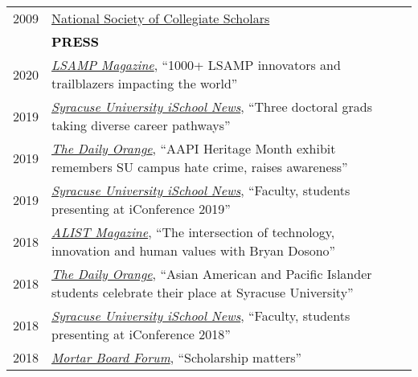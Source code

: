 \documentclass[11pt]{article}
\begin{document}
{{\begin{longtable}{Rp{0.75in}p{5.0in}}
\footnotesize{2009} & \href{https://nscs.org/}{National Society of Collegiate Scholars}\\

& \textcolor{black}{\uppercase{\textbf{Press}}}\\

\footnotesize{2020} & \href{https://lsmrce.org/documents/community/LSAMP-Trailblazers-Magazine-2020.pdf}{\textit{LSAMP Magazine}}, ``1000+ LSAMP innovators and trailblazers impacting the world''\\

\footnotesize{2019} & \href{https://ischool.syr.edu/three-doctoral-grads-taking-diverse-career-pathways-2019/}{\textit{Syracuse University iSchool News}}, ``Three doctoral grads taking diverse career pathways''\\

\footnotesize{2019} & \href{http://dailyorange.com/2019/04/aapi-heritage-month-exhibit-remembers-su-campus-hate-crime-raises-awareness/}{\textit{The Daily Orange}}, ``AAPI Heritage Month exhibit remembers SU campus hate crime, raises awareness''\\

\footnotesize{2019} & \href{https://ischool.syr.edu/faculty-students-presenting-at-iconference-2019/}{\textit{Syracuse University iSchool News}}, ``Faculty, students presenting at iConference 2019''\\

\footnotesize{2018} & \href{https://issuu.com/alist_magazine/docs/alist_summer_2018_final}{\textit{ALIST Magazine}}, ``The intersection of technology, innovation and human values with Bryan Dosono''\\

\footnotesize{2018} & \href{http://dailyorange.com/2018/04/asian-american-pacific-islander-students-celebrate-place-syracuse-university/}{\textit{The Daily Orange}}, ``Asian American and Pacific Islander students celebrate their place at Syracuse University''\\

\footnotesize{2018} & \href{https://ischool.syr.edu/faculty-students-presenting-iconference-2018/}{\textit{Syracuse University iSchool News}}, ``Faculty, students presenting at iConference 2018''\\

\footnotesize{2018} & \href{http://cdn.coverstand.com/35468/480339/07e4eb31edcfe2fac898ccb79316b89262b1bbe7.pdf}{\textit{Mortar Board Forum}}, ``Scholarship matters''\\


\end{longtable}}}
\end{document}
